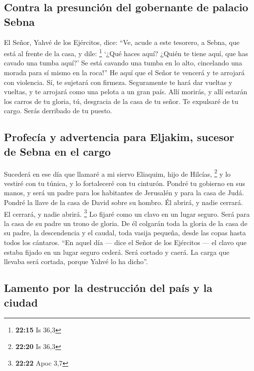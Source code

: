 \hypertarget{contra-la-presunciuxf3n-del-gobernante-de-palacio-sebna}{%
\subsection{Contra la presunción del gobernante de palacio
Sebna}\label{contra-la-presunciuxf3n-del-gobernante-de-palacio-sebna}}

 El Señor, Yahvé de los Ejércitos, dice: ``Ve, acude a
este tesorero, a Sebna, que está al frente de la casa, y dile:
\footnote{\textbf{22:15} Is 36,3}  `¿Qué haces aquí?
¿Quién te tiene aquí, que has cavado una tumba aquí?' Se está cavando
una tumba en lo alto, cincelando una morada para sí mismo en la roca!''
 He aquí que el Señor te vencerá y te arrojará con
violencia. Sí, te sujetará con firmeza.  Seguramente te
hará dar vueltas y vueltas, y te arrojará como una pelota a un gran
país. Allí morirás, y allí estarán los carros de tu gloria, tú,
desgracia de la casa de tu señor.  Te expulsaré de tu
cargo. Serás derribado de tu puesto.

\hypertarget{profecuxeda-y-advertencia-para-eljakim-sucesor-de-sebna-en-el-cargo}{%
\subsection{Profecía y advertencia para Eljakim, sucesor de Sebna en el
cargo}\label{profecuxeda-y-advertencia-para-eljakim-sucesor-de-sebna-en-el-cargo}}

 Sucederá en ese día que llamaré a mi siervo Eliaquim,
hijo de Hilcías, \footnote{\textbf{22:20} Is 36,3}  y lo
vestiré con tu túnica, y lo fortaleceré con tu cinturón. Pondré tu
gobierno en sus manos, y será un padre para los habitantes de Jerusalén
y para la casa de Judá.  Pondré la llave de la casa de
David sobre su hombro. Él abrirá, y nadie cerrará. El cerrará, y nadie
abrirá. \footnote{\textbf{22:22} Apoc 3,7}  Lo fijaré
como un clavo en un lugar seguro. Será para la casa de su padre un trono
de gloria.  De él colgarán toda la gloria de la casa de
su padre, la descendencia y el caudal, toda vasija pequeña, desde las
copas hasta todos los cántaros.  ``En aquel día --- dice
el Señor de los Ejércitos --- el clavo que estaba fijado en un lugar
seguro cederá. Será cortado y caerá. La carga que llevaba será cortada,
porque Yahvé lo ha dicho''.

\hypertarget{lamento-por-la-destrucciuxf3n-del-pauxeds-y-la-ciudad}{%
\subsection{Lamento por la destrucción del país y la
ciudad}\label{lamento-por-la-destrucciuxf3n-del-pauxeds-y-la-ciudad}}

